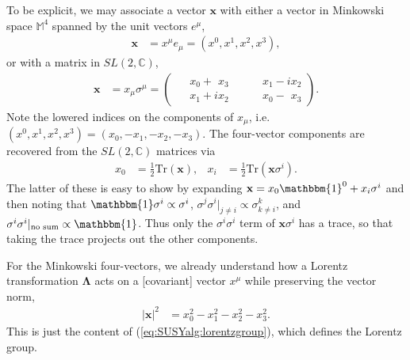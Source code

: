 \documentclass[12pt, oneside]{report}    %
\begin{document}
To be explicit, we may associate a vector $\mathbf x$ with either a vector in Minkowski space $\mathbb M^4$ spanned by the unit vectors $e^\mu$,
\begin{align}
    \mathbf x &= x^\mu e_\mu = \left(x^0,x^1,x^2,x^3\right),\label{eq:susyalg:vectorrep}
\end{align}
    or with a matrix in $SL(2,\mathbb C)$,
\begin{align}
    \mathbf x &= x_\mu \sigma^\mu
              = \begin{pmatrix}
                \phantom+x_0 + \phantom{i} x_3 &\quad \phantom+ x_1-ix_2\\
                \phantom+x_1+ix_2 &\quad \phantom+ x_0-\phantom{i} x_3
              \end{pmatrix}.\label{eq:susyalg:sl2crep}
\end{align}
Note the lowered indices on the components of $x_\mu$, i.e. $(x^0,x^1,x^2,x^3) = (x_0,-x_1,-x_2,-x_3)$. The four-vector components are recovered from the $SL(2,\mathbb C)$ matrices via
\begin{align}
    x_0 &= \frac 12\text{Tr}(\mathbf{x}), & x_i &= \frac 12\text{Tr}(\mathbf{x}\sigma^i).\label{eq:SUSYalg:sl2ctom4}
\end{align}
The latter of these is easy to show by expanding $\mathbf{x} = x_0\mathbbm{1}^0 + x_i\sigma^i$ and then noting that $\mathbbm{1}\sigma^i \propto \sigma^i$, $\sigma^j\sigma^i|_{j\neq i}\propto \sigma^k_{k\neq i}$, and $\sigma^i\sigma^i|_{\text{no sum}}\propto \mathbbm{1}$. Thus only the $\sigma^i\sigma^i$ term of $\mathbf{x}\sigma^i$ has a trace, so that taking the trace projects out the other components.

For the Minkowski four-vectors, we already understand how a Lorentz transformation $\mathbf \Lambda$ acts on a [covariant] vector $x^\mu$ while preserving the vector norm,   
\begin{align}
    |\mathbf x |^2 &= x_0^2 - x_1^2 - x_2^2 - x_3^2.\label{eq:SUSYalg:mink:invt}
\end{align}
This is just the content of  (\ref{eq:SUSYalg:lorentzgroup}), which defines the Lorentz group.
\end{document}
